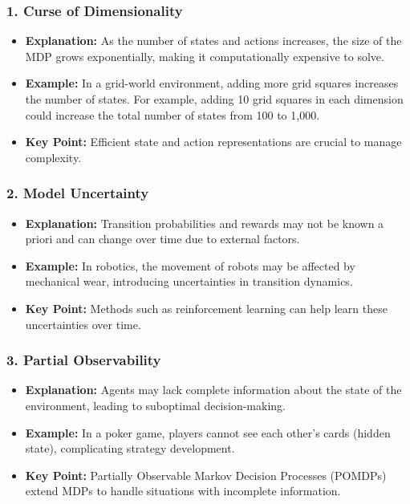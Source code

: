\documentclass[aspectratio=169]{beamer}
\begin{document}
\begin{frame}[fragile]
    \frametitle{1. Curse of Dimensionality}
    \begin{itemize}
        \item \textbf{Explanation:} As the number of states and actions increases, the size of the MDP grows exponentially, making it computationally expensive to solve.
        \item \textbf{Example:} In a grid-world environment, adding more grid squares increases the number of states. For example, adding 10 grid squares in each dimension could increase the total number of states from 100 to 1,000.
        \item \textbf{Key Point:} Efficient state and action representations are crucial to manage complexity.
    \end{itemize}
\end{frame}

\begin{frame}[fragile]
    \frametitle{2. Model Uncertainty}
    \begin{itemize}
        \item \textbf{Explanation:} Transition probabilities and rewards may not be known a priori and can change over time due to external factors.
        \item \textbf{Example:} In robotics, the movement of robots may be affected by mechanical wear, introducing uncertainties in transition dynamics.
        \item \textbf{Key Point:} Methods such as reinforcement learning can help learn these uncertainties over time.
    \end{itemize}
\end{frame}

\begin{frame}[fragile]
    \frametitle{3. Partial Observability}
    \begin{itemize}
        \item \textbf{Explanation:} Agents may lack complete information about the state of the environment, leading to suboptimal decision-making.
        \item \textbf{Example:} In a poker game, players cannot see each other's cards (hidden state), complicating strategy development.
        \item \textbf{Key Point:} Partially Observable Markov Decision Processes (POMDPs) extend MDPs to handle situations with incomplete information.
    \end{itemize}
\end{frame}
\end{document}

